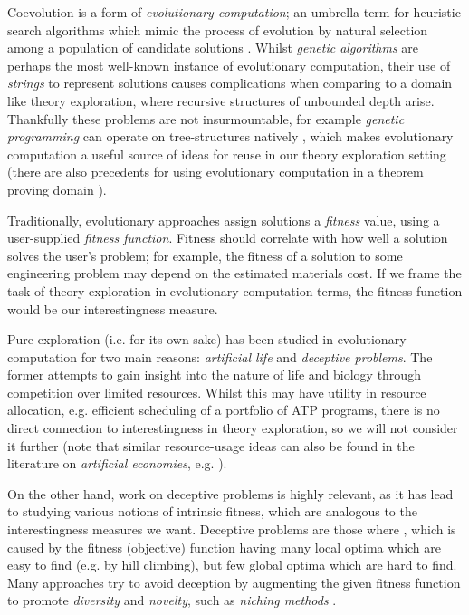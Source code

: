 Coevolution is a form of \emph{evolutionary computation}; an umbrella term for
heuristic search algorithms which mimic the process of evolution by natural
selection among a population of candidate solutions
\cite{back1997evolutionary}. Whilst \emph{genetic algorithms} are perhaps the
most well-known instance of evolutionary computation, their use of
\emph{strings} to represent solutions causes complications when comparing to a
domain like theory exploration, where recursive structures of unbounded depth
arise. Thankfully these problems are not insurmountable, for example
\emph{genetic programming} can operate on tree-structures natively
\cite{banzhaf1998genetic}, which makes evolutionary computation a useful source
of ideas for reuse in our theory exploration setting (there are also precedents
for using evolutionary computation in a theorem proving domain
\cite{spector2008genetic}).

Traditionally, evolutionary approaches assign solutions a \emph{fitness} value,
using a user-supplied \emph{fitness function}. Fitness should correlate with how
well a solution solves the user's problem; for example, the fitness of a
solution to some engineering problem may depend on the estimated materials
cost. If we frame the task of theory exploration in evolutionary computation
terms, the fitness function would be our interestingness measure.

Pure exploration (i.e. for its own sake) has been studied in evolutionary
computation for two main reasons: \emph{artificial life} and \emph{deceptive
  problems}. The former attempts to gain insight into the nature of life and
biology through competition over limited resources. Whilst this may have utility
in resource allocation, e.g. efficient scheduling of a portfolio of ATP
programs, there is no direct connection to interestingness in theory
exploration, so we will not consider it further (note that similar
resource-usage ideas can also be found in the literature on \emph{artificial
  economies}, e.g. \cite{baum2000evolution}).

On the other hand, work on deceptive problems is highly relevant, as it has lead
to studying various notions of intrinsic fitness, which are analogous to the
interestingness measures we want. Deceptive problems are those where
\cite{lehman2011abandoning}, which is caused by the fitness (objective)
function having many local optima which are easy to find (e.g. by hill
climbing), but few global optima which are hard to find. Many approaches try to
avoid deception by augmenting the given fitness function to promote
\emph{diversity} and \emph{novelty}, such as \emph{niching methods}
\cite{sareni1998fitness}.

